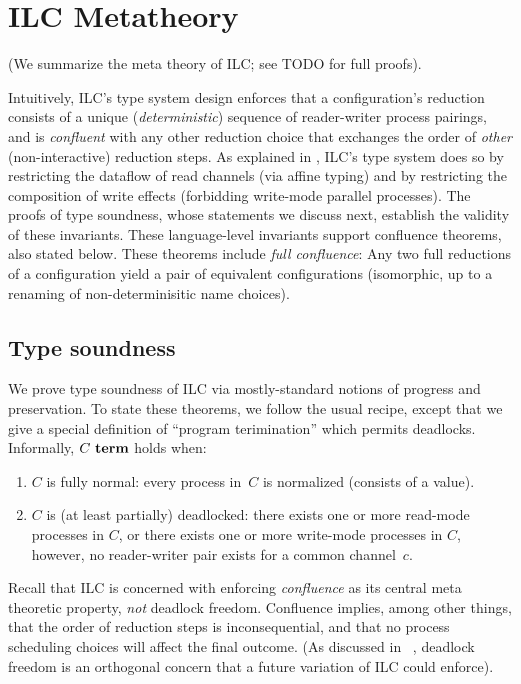 \section{ILC Metatheory}
\label{sec:metatheory}

(We summarize the meta theory of ILC; see TODO for full proofs).

Intuitively, ILC's type system design enforces that a
configuration's reduction consists of a unique
(\emph{deterministic}) sequence of reader-writer process pairings,
and is \emph{confluent} with any other reduction choice that exchanges 
the order of \emph{other} (non-interactive) reduction steps.
%
As explained in , 
ILC's type system does so by restricting the dataflow of read channels
(via affine typing) 
and by restricting the composition of write effects 
(forbidding write-mode parallel processes).
%
The proofs of type soundness, whose statements we discuss next, 
establish the validity of these invariants.
%
These language-level invariants support confluence theorems, also
stated below.
%
These theorems include \emph{full confluence}:
Any two full reductions of a configuration yield a pair of equivalent configurations
(isomorphic, up to a renaming of non-determinisitic name choices).

\subsection{Type soundness}

We prove type soundness of ILC via mostly-standard notions of progress
and preservation.
%
To state these theorems, we follow the usual recipe, except that we
give a special definition of ``program terimination'' which permits
deadlocks.
%
Informally, $C~\textbf{term}$ holds when:
\begin{enumerate}
 \item $C$ is fully normal: every process in~$C$  
   is normalized (consists of a value).
 \item $C$ is (at least partially) deadlocked: 
   there exists one or more read-mode processes in $C$, or
   there exists one or more write-mode processes in $C$,
   however, no reader-writer pair exists for a common channel~$c$.
\end{enumerate}

Recall that ILC is concerned with enforcing \emph{confluence} as its
central meta theoretic property, \emph{not} deadlock freedom.
%
Confluence implies, among other things, that the order of reduction steps is
inconsequential, and that no process scheduling choices will affect
the final outcome.
%
(As discussed in ~, deadlock freedom is an
orthogonal concern that a future variation of ILC could enforce).

